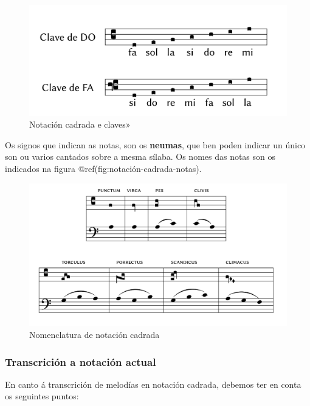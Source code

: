 \documentclass[a4paper, twoside]{templates/ociamthesis}
\begin{document}
\begin{figure}[ht]

{\centering \includegraphics[width=0.5\linewidth]{figures/ud-03/notacion-cadrada-claves} 

}

\caption[Notación cadrada]{Notación cadrada e claves» }\label{fig:notacion-cadrada}
\end{figure}

Os signos que indican as notas, son os \textbf{neumas}, que ben poden indicar un único son ou varios cantados sobre a mesma sílaba. Os nomes das notas son os indicados na figura @ref(fig:notación-cadrada-notas).

\begin{figure}[ht]

{\centering \includegraphics[width=0.75\linewidth]{figures/ud-03/notacion-cadrada-notas} 

}

\caption[Notación cadrada, notas]{Nomenclatura de notación cadrada}\label{fig:notacion-cadrada-notas}
\end{figure}

\hypertarget{transcriciuxf3n-a-notaciuxf3n-actual}{%
\subsubsection{Transcrición a notación actual}\label{transcriciuxf3n-a-notaciuxf3n-actual}}

En canto á transcrición de melodías en notación cadrada, debemos ter en conta os seguintes puntos:
\end{document}
